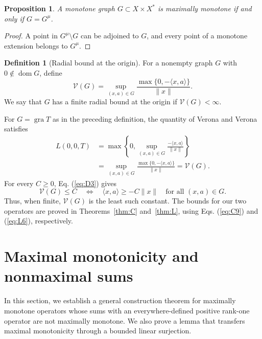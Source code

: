 \documentclass[11pt]{article}
\newcommand{\gra}{\operatorname{gra}}
\newcommand{\dom}{\operatorname{dom}}
\newcommand{\pair}[2]{\langle #1,#2\rangle}
\newtheorem{proposition}{Proposition}
\theoremstyle{definition}
\newtheorem{definition}{Definition}
\theoremstyle{remark}
\begin{document}
\begin{proposition}
A monotone graph $G\subset X\times X^*$ is maximally monotone if and only if $G=G^\mu$.
\end{proposition}
\begin{proof}
A point in $G^\mu\setminus G$ can be adjoined to $G$, and every point of a monotone extension belongs to $G^\mu$.
\end{proof}




\begin{definition}[Radial bound at the origin]
\label{def:radial-bound}
For a nonempty graph $G$ with $0\notin\dom G$, define
\begin{equation}
\mathcal V(G)=\sup_{(x,a)\in G}
 \frac{\max\{0,-\pair{x}{a}\}}{\|x\|}.
\label{eq:D3}
\end{equation}
We say that $G$ has a finite radial bound at the origin if $\mathcal V(G)<\infty$.
\end{definition}
For $G=\gra T$ as in the preceding definition, the quantity of Verona and Verona \cite{verona2008} satisfies
\[
\begin{aligned}
L(0,0,T)
&=\max\left\{0,\sup_{(x,a)\in G}\frac{-\pair{x}{a}}{\|x\|}\right\}\\
&=\sup_{(x,a)\in G}\frac{\max\{0,-\pair{x}{a}\}}{\|x\|}
=\mathcal V(G).
\end{aligned}
\]
For every $C\ge0$, Eq. (\ref{eq:D3}) gives
\[
\mathcal V(G)\le C
\quad\Longleftrightarrow\quad
\pair{x}{a}\ge-C\|x\|\quad\text{for all }(x,a)\in G.
\]
Thus, when finite, $\mathcal V(G)$ is the least such constant. The bounds for our two operators are proved in Theorems~\ref{thm:C} and~\ref{thm:L}, using Eqs. (\ref{eq:C9}) and (\ref{eq:L6}), respectively.

\section{Maximal monotonicity and nonmaximal sums}
\label{sec:endpoint-criterion}

In this section, we establish a general construction theorem for maximally monotone operators whose sums with an everywhere-defined positive rank-one operator are not maximally monotone. We also prove a lemma that transfers maximal monotonicity through a bounded linear surjection.

\end{document}
